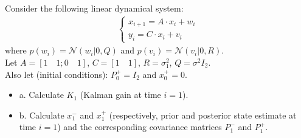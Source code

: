 \Exercise[number={6}]
Consider the following linear dynamical system:
\begin{align*}
    \begin{cases}
        x_{i+1}=A\cdot x_i + w_i \\ y_i=C\cdot x_i + v_i
    \end{cases}
\end{align*}
where \(p(w_i)=\mathcal{N}(w_i|0,Q)\) and \(p(v_i)=\mathcal{N}(v_i|0,R)\).\\
Let \(A=[1\quad1; 0\quad1]\), \(C=[1\quad 1]\), \(R=\sigma_1^2\), \(Q=\sigma^2I_2\).\\
Also let (initial conditions): \(P_0^+=I_2\) and \(x_0^+=0\).
\begin{itemize}
    \item\quad a. Calculate \(K_1\) (Kalman gain at time \(i=1\)).
    \item\quad b. Calculate \(x_1^-\) and \(x_1^+\) (respectively, prior
    and posterior state estimate at time \(i=1\)) and the corresponding
    covariance matrices \(P_1^-\) and \(P_1^+\).
\end{itemize}

